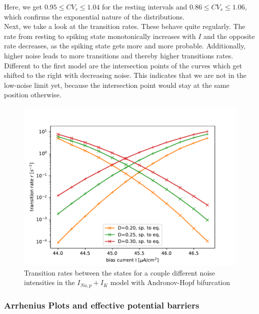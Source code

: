\documentclass[12pt,a4paper]{article}
\begin{document}
Here, we get $0.95\leq CV_r\leq 1.04$ for the resting intervals and $0.86\leq CV_s\leq 1.06$, which confirms the exponential nature of the distributions.
\\
Next, we take a look at the transition rates.
These behave quite regularly. The rate from resting to spiking state monotonically increases with $I$ and the opposite rate decreases, as the spiking state gets more and more probable. Additionally, higher noise leads to more transitions and thereby higher transitions rates. Different to the first model are the intersection points of the curves which get shifted to the right with decreasing noise. This indicates that we are not in the low-noise limit yet, because the intersection point would stay at the same position otherwise.
\begin{figure}[H]
	\centering
	\includegraphics[scale=1]{tranratesanhopfsp.pdf}\caption{Transition rates between the states for a couple different noise intensities in the $I_{Na,p}+I_K$ model with Andronov-Hopf bifurcation}
	\label{tranrateanhopf}
\end{figure}
\subsubsection{Arrhenius Plots and effective potential barriers}
\end{document}
